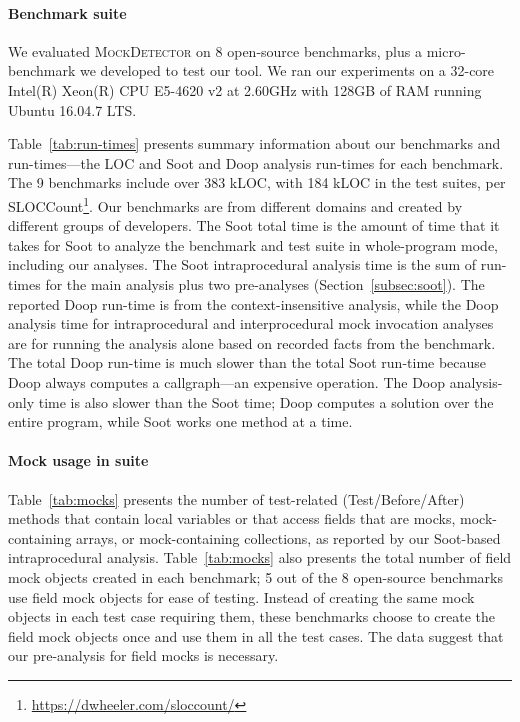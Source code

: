 \paragraph{Benchmark suite} We evaluated \textsc{MockDetector} on 8 open-source benchmarks, plus a micro-benchmark we developed to test our tool. We ran our experiments on a 32-core Intel(R) Xeon(R) CPU E5-4620 v2 at 2.60GHz with 128GB of RAM running Ubuntu 16.04.7 LTS.

Table~\ref{tab:run-times} presents summary information about our benchmarks and run-times---the LOC and Soot and Doop analysis run-times for each benchmark. The 9 benchmarks include over 383 kLOC, with 184 kLOC in the test suites, per SLOCCount\footnote{\url{https://dwheeler.com/sloccount/}}.  Our benchmarks are from different domains and created by different groups of developers. The Soot total time is the amount of time that it takes for Soot to analyze the benchmark and test suite in whole-program mode, including our analyses. The Soot intraprocedural analysis time is the sum of run-times for the main analysis plus two pre-analyses (Section~\ref{subsec:soot}). The reported Doop run-time is from the context-insensitive analysis, while the Doop analysis time for intraprocedural and interprocedural mock invocation analyses are for running the analysis alone based on recorded facts from the benchmark. The total Doop run-time is much slower than the total Soot run-time because Doop always computes a callgraph---an expensive operation. The Doop analysis-only time is also slower than the Soot time; Doop computes a solution over the entire program, while Soot works one method at a time.

\paragraph{Mock usage in suite} Table~\ref{tab:mocks} presents the number of test-related (Test/Before/After) methods that contain local variables or that access fields that are mocks, mock-containing arrays, or mock-containing collections, as reported by our Soot-based intraprocedural analysis. Table~\ref{tab:mocks} also presents the total number of field mock objects created in each benchmark; 5 out of the 8 open-source benchmarks use field mock objects for ease of testing. Instead of creating the same mock objects in each test case requiring them, these benchmarks choose to create the field mock objects once and use them in all the test cases. The data suggest that our pre-analysis for field mocks is necessary.

